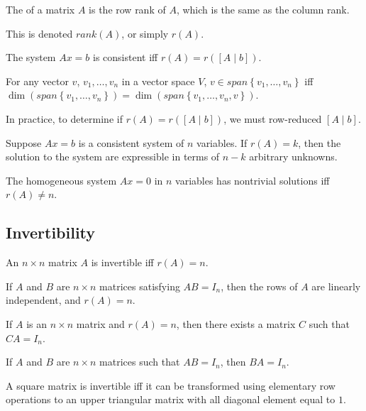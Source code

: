\begin{definition}[Rank]
  The  of a matrix $A$ is the row rank of $A$, which is the same as the column rank.

  This is denoted $rank(A)$, or simply $r(A)$.
\end{definition}

\begin{theorem}
  The system $Ax = b$ is consistent iff $r(A) = r(\left[A \mid b\right])$.
\end{theorem}

\begin{lemma}
  For any vector $v$, $v_{1}, \dots, v_{n}$ in a vector space $V$, $v \in span \left\{v_{1}, \dots, v_{n}\right\}$
  iff $\dim(span \left\{v_{1}, \dots, v_{n}\right\}) = \dim(span \left\{v_{1}, \dots, v_{n}, v\right\})$.
\end{lemma}

\begin{remark}
  In practice, to determine if $r(A) = r(\left[A \mid b\right])$, we must row-reduced $\left[A \mid b\right]$.
\end{remark}

\begin{theorem}
  Suppose $Ax = b$ is a consistent system of $n$ variables. If $r(A) = k$, then the solution to the system are expressible in terms of $n - k$ arbitrary unknowns.
\end{theorem}

\begin{corollary}
  The homogeneous system $Ax = 0$ in $n$ variables has nontrivial solutions iff $r(A) \neq n$.
\end{corollary}

\subsection{Invertibility}
\begin{theorem}
  An $n \times n$ matrix $A$ is invertible iff $r(A) = n$. 
\end{theorem}

\begin{lemma}
  If $A$ and $B$ are $n \times n$ matrices satisfying $AB = I_{n}$, then the rows of $A$ are linearly independent, and $r(A) = n$.
\end{lemma}

\begin{lemma}
  If $A$ is an $n \times n$ matrix and $r(A) = n$, then there exists a matrix $C$ such that $CA = I_{n}$.
\end{lemma}

\begin{lemma}
  If $A$ and $B$ are $n \times n$ matrices such that $AB = I_{n}$, then $BA = I_{n}$.
\end{lemma}

\begin{corollary}
  A square matrix is invertible iff it can be transformed using elementary row operations to an upper triangular matrix with all diagonal element equal to $1$.
\end{corollary}





